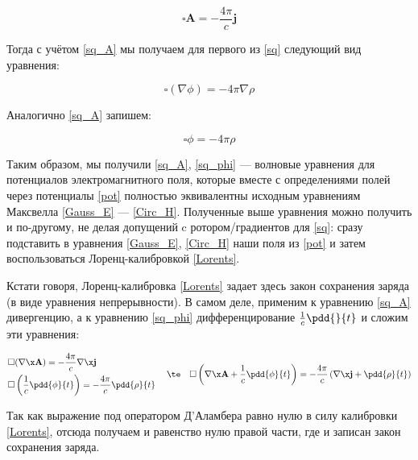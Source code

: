 \documentclass[12pt]{kiarticle}
\begin{document}
\begin{equation}\label{sq_A}
\square \mathbf{A} = - \dfrac{4\pi}{c}\mathbf{j}
\end{equation}

Тогда с учётом \eqref{sq_A} мы получаем для первого из \eqref{sq} следующий вид уравнения:

\begin{equation}\label{}
\square (\nabla \phi) = -4\pi \nabla \rho
\end{equation}

Аналогично \eqref{sq_A} запишем:

\begin{equation}\label{sq_phi}
\square \phi = - 4 \pi \rho
\end{equation}

Таким образом, мы получили \eqref{sq_A}, \eqref{sq_phi} --- волновые уравнения для потенциалов электромагнитного поля, которые вместе с определениями полей через потенциалы \eqref{pot} полностью эквивалентны исходным уравнениям Максвелла \eqref{Gauss_E} --- \eqref{Circ_H}. Полученные выше уравнения можно получить и по-другому, не делая допущений c ротором/градиентов для \eqref{sq}: сразу подставить в уравнения \eqref{Gauss_E}, \eqref{Circ_H} наши поля из \eqref{pot} и затем воспользоваться Лоренц-калибровкой \eqref{Lorents}.

Кстати говоря, Лоренц-калибровка \eqref{Lorents} задает здесь закон сохранения заряда (в виде уравнения непрерывности). В самом деле, применим к уравнению \eqref{sq_A} дивергенцию, а к уравнению \eqref{sq_phi} дифференцирование $ \frac{1}{c}\pdd{}{t} $ и сложим эти уравнения: 

\begin{equation}\label{}
\left.
\begin{aligned}
& \square (\nabla \x \mathbf{A}) = - \dfrac{4\pi}{c} \nabla \x \mathbf{j} \\
& \square \left(  \dfrac{1}{c}\pdd{\phi}{t} \right)  = - \dfrac{4\pi}{c} \pdd{\rho}{t}
\end{aligned}
\right.
\quad \te \quad
\square \left( \nabla \x \mathbf{A}+ \dfrac{1}{c} \pdd{\phi}{t} \right)  = - \dfrac{4 \pi}{c} \left(  \nabla \x \mathbf{j} + \pdd{\rho}{t} \right) 
\end{equation}

Так как выражение под оператором Д'Аламбера равно нулю в силу калибровки \eqref{Lorents}, отсюда получаем и равенство нулю правой части, где и записан закон сохранения заряда. 
\end{document}
